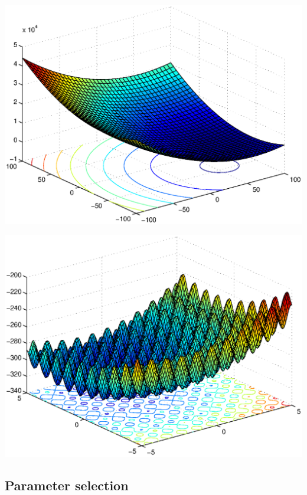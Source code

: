 \documentclass{csfourzero}
\newenvironment{Figure}
  {\par\medskip\noindent\minipage{\linewidth}}
  {\endminipage\par\medskip}
\begin{document}
\begin{multicols}{2}
\begin{Figure}
  \centering
  \includegraphics[width=\linewidth]{../functions/sphere_shifted.eps}
\end{Figure}

\begin{Figure}
  \centering
  \includegraphics[width=\linewidth]{../functions/rastrigin_shifted.eps}
\end{Figure}

\end{multicols}



\subsection{Parameter selection}
\end{document}
